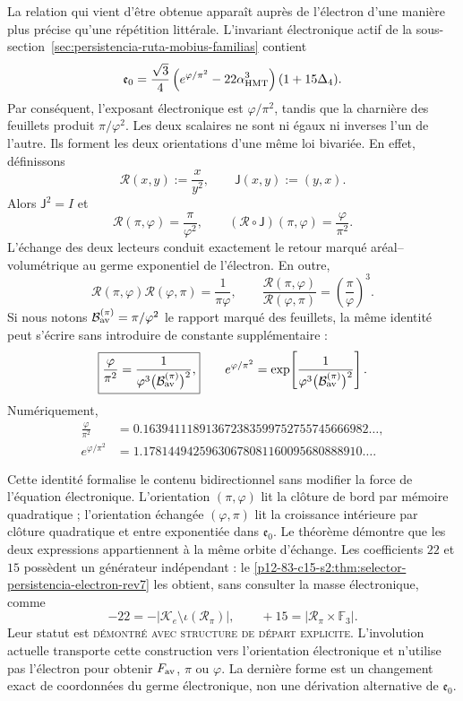 La relation qui vient d'être obtenue apparaît auprès de l'électron d'une manière plus
précise qu'une répétition littérale. L'invariant électronique actif de la
sous-section~\ref{sec:persistencia-ruta-mobius-familias} contient
\[
 \mathfrak e_0=
 \frac{\sqrt3}{4}
 \left(e^{\varphi/\pi^2}-22\alpha_{\rm HMT}^{3}\right)
 (1+15\Delta_4).
\]
Par conséquent, l'exposant électronique est \(\varphi/\pi^2\), tandis que la
charnière des feuillets produit \(\pi/\varphi^2\). Les deux scalaires ne sont
ni égaux ni inverses l'un de l'autre. Ils forment les deux orientations d'une même loi
bivariée. En effet, définissons
\[
 \mathscr R(x,y):=\frac{x}{y^2},
 \qquad
 \mathsf J(x,y):=(y,x).
\]
Alors \(\mathsf J^2=I\) et
\[
 \boxed{
 \mathscr R(\pi,\varphi)=\frac{\pi}{\varphi^2},
 \qquad
 (\mathscr R\circ\mathsf J)(\pi,\varphi)
 =\frac{\varphi}{\pi^2}.}
\]
L'échange des deux lecteurs conduit exactement le retour marqué
aréal--volumétrique au germe exponentiel de l'électron. En outre,
\[
 \mathscr R(\pi,\varphi)\mathscr R(\varphi,\pi)
 =\frac1{\pi\varphi},
 \qquad
 \frac{\mathscr R(\pi,\varphi)}
 {\mathscr R(\varphi,\pi)}
 =\left(\frac{\pi}{\varphi}\right)^3.
\]
Si nous notons
\(\mathcal B_{\rm av}^{(\pi)}=\pi/\varphi^2\) le rapport marqué des
feuillets, la même identité peut s'écrire sans introduire de constante
supplémentaire :
\[
 \boxed{
 \frac{\varphi}{\pi^2}
 =
 \frac{1}
 {\varphi^3\bigl(\mathcal B_{\rm av}^{(\pi)}\bigr)^2},}
 \qquad
 e^{\varphi/\pi^2}
 =
 \exp\!\left[
 \frac{1}
 {\varphi^3\bigl(\mathcal B_{\rm av}^{(\pi)}\bigr)^2}
 \right].
\]
Numériquement,
\[
 \begin{aligned}
 \frac{\varphi}{\pi^2}
 &=0.163941118913672383599752755745666982\ldots,\\
 e^{\varphi/\pi^2}
 &=1.17814494259630678081160095680888910\ldots.
 \end{aligned}
\]

Cette identité formalise le contenu bidirectionnel sans modifier la force de
l'équation électronique. L'orientation \((\pi,\varphi)\) lit la clôture de bord
par mémoire quadratique ; l'orientation échangée
\((\varphi,\pi)\) lit la croissance intérieure par clôture quadratique et entre
exponentiée dans \(\mathfrak e_0\). Le théorème démontre que les deux
expressions appartiennent à la même orbite d'échange. Les coefficients
\(22\) et \(15\) possèdent un générateur indépendant : le
\cref{p12-83-c15-s2:thm:selector-persistencia-electron-rev7} les obtient, sans consulter la
masse électronique, comme
\[
 -22=-\bigl|\mathcal K_e\setminus\iota(\mathscr R_\pi)\bigr|,
 \qquad
 +15=\bigl|\mathscr R_\pi\times\mathbb F_3\bigr|.
\]
Leur statut est \textsc{démontré avec structure de départ explicite}.
L'involution actuelle transporte cette construction vers l'orientation électronique et
n'utilise pas l'électron pour obtenir \(F_{\rm av}\), \(\pi\) ou \(\varphi\). La
dernière forme est un changement exact de coordonnées du germe électronique, non
une dérivation alternative de \(\mathfrak e_0\).

